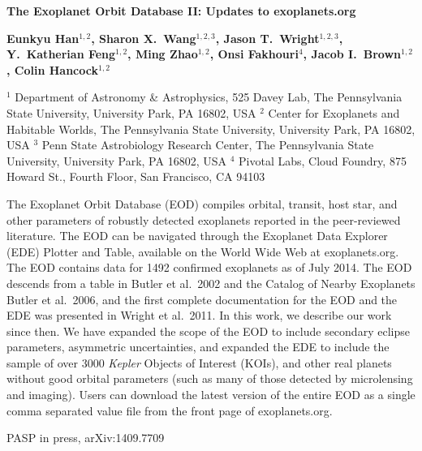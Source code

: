 {\large\bf{The Exoplanet Orbit Database \textsc{II}: Updates to
  exoplanets.org}

{\bf{Eunkyu Han$^{1,2}$, Sharon X.~Wang$^{1,2,3}$, Jason T.~Wright$^{1,2,3}$, Y.\
  Katherian Feng$^{1,2}$, Ming Zhao$^{1,2}$, Onsi
  Fakhouri$^{4}$, Jacob I.\ Brown$^{1,2}$, Colin Hancock$^{1,2}$}} 

$^1$ {Department of Astronomy \& Astrophysics, 525 Davey
  Lab, The Pennsylvania State University, University Park, PA 16802, USA}
$^2$ {Center for Exoplanets and Habitable Worlds, The
  Pennsylvania State University, University Park, PA 16802, USA}
$^3$ {Penn State Astrobiology Research Center, The
  Pennsylvania State University, University Park, PA 16802, USA}
$^4$ {Pivotal Labs, Cloud Foundry, 875 Howard St., Fourth
  Floor, San Francisco, CA 94103}  

{The Exoplanet Orbit Database (EOD) compiles orbital, transit, host
star, and other parameters of robustly detected exoplanets reported in
the peer-reviewed literature. The EOD can be navigated through the
Exoplanet Data Explorer (EDE) Plotter and Table, available on the
World Wide Web at exoplanets.org. The EOD contains data for 1492
confirmed exoplanets as of July 2014.  The EOD descends from a table
in Butler et al.\ 2002 and the Catalog of Nearby Exoplanets
Butler et al.\ 2006, and the first complete documentation for the EOD
and the EDE was presented in Wright et al.\ 2011. In this work, we
describe our work since then.  We have expanded the scope of the EOD
to include secondary eclipse parameters, asymmetric uncertainties, and
expanded the EDE to include the sample of over 3000 \textit{Kepler} Objects
of Interest (KOIs), and other real planets without good orbital
parameters (such as many of those detected by microlensing and
imaging). Users can download the latest version of the entire EOD as a
single comma separated value file from the front page of
exoplanets.org.}

{ PASP in press, arXiv:1409.7709 }

}
